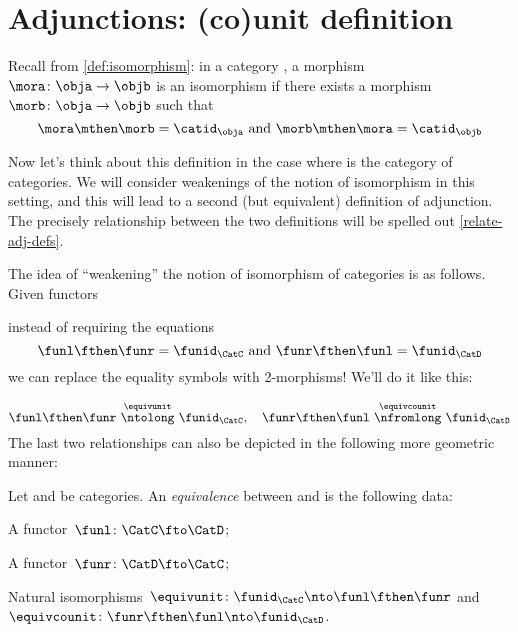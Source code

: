 \section{Adjunctions: (co)unit definition}

Recall from \cref{def:isomorphism}: in a category \CatC, a morphism~$\mora \colon \obja \to \objb$ is an isomorphism if there exists a morphism~$\morb \colon \obja \rightarrow \objb$ such that
\begin{equation*}
  \mora \mthen \morb = \catid_\obja \text{ and } \morb \mthen \mora = \catid_\objb
\end{equation*}

Now let's think about this definition in the case where \CatC is the category \Category of categories. We will consider weakenings of the notion of isomorphism in this setting, and this will lead to a second (but equivalent) definition of adjunction. The precisely relationship between the two definitions will be spelled out \cref{relate-adj-defs}.

The idea of ``weakening'' the notion of isomorphism of categories is as follows. Given functors
\begin{center}
\end{center}
instead of requiring the equations
\begin{equation*}
  \funl \fthen \funr = \funid_\CatC  \text{ and } \funr \fthen \funl = \funid_\CatD
\end{equation*}
we can replace the equality symbols with 2-morphisms! We'll do it like this:

\begin{equation*}
  \funl \fthen \funr \ \overset{\equivunit}{\ntolong}\  \funid_\CatC, \quad  \funr \fthen \funl \ \overset{\equivcounit}{\nfromlong}\  \funid_\CatD
\end{equation*}
The last two relationships can also be depicted in the following more geometric manner:
\begin{center}
  \hspace{1cm}
\end{center}

\begin{ctdefinition}
  \label{def:cat-equivalence}
  Let \CatC and \CatD be categories. An \emph{equivalence} between \CatC and \CatD is the following data:
  \begin{compactenum}
    \item A functor~$\funl \colon \CatC \fto \CatD$;
    \item A functor~$\funr \colon \CatD \fto \CatC$;
    \item Natural isomorphisms~$\equivunit \colon \funid_\CatC \nto \funl \fthen \funr$ and~$\equivcounit \colon  \funr \fthen \funl \nto \funid_\CatD$.
  \end{compactenum}
\end{ctdefinition}

